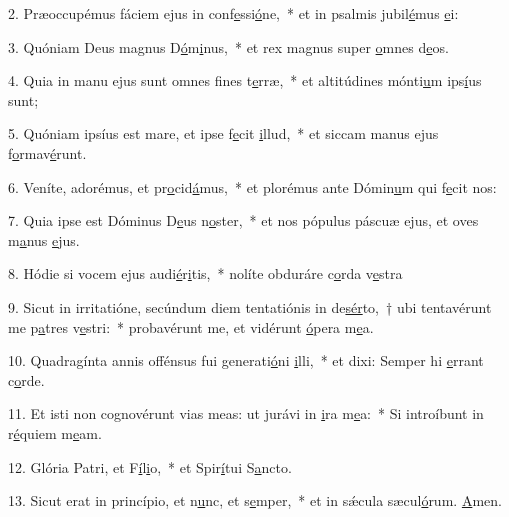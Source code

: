 2. Præoccupémus fáciem ejus in conf\uline{e}ssi\uline{ó}ne,~* et in psalmis jubil\uline{é}mus \uline{e}i:\par 
3. Quóniam Deus magnus D\uline{ó}m\uline{i}nus,~* et rex magnus super \uline{o}mnes d\uline{e}os.\par 
4. Quia in manu ejus sunt omnes f\uline{i}nes t\uline{e}rræ,~* et altitúdines mónti\uline{u}m ips\uline{í}us sunt;\par 
5. Quóniam ipsíus est mare, et ipse f\uline{e}cit \uline{i}llud,~* et siccam manus ejus f\uline{o}rmav\uline{é}runt.\par 
6. Veníte, adorémus, et pr\uline{o}cid\uline{á}mus,~* et plorémus ante Dómin\uline{u}m qui f\uline{e}cit nos:\par 
7. Quia ipse est Dóminus D\uline{e}us n\uline{o}ster,~* et nos pópulus páscuæ ejus, et oves m\uline{a}nus \uline{e}jus.\par 
8. Hódie si vocem ejus audi\uline{é}r\uline{i}tis,~* nolíte obduráre c\uline{o}rda v\uline{e}stra\par 
9. Sicut in irritatióne, secúndum diem tentatiónis in de\uline{sér}to,~† ubi tentavérunt me p\uline{a}tres v\uline{e}stri:~* probavérunt me, et vidérunt \uline{ó}pera m\uline{e}a.\par 
10. Quadragínta annis offénsus fui generati\uline{ó}ni \uline{i}lli,~* et dixi: Semper hi \uline{e}rrant c\uline{o}rde.\par 
11. Et isti non cognovérunt vias meas: ut jurávi in \uline{i}ra m\uline{e}a:~* Si introíbunt in r\uline{é}quiem m\uline{e}am.\par 
12. Glória Patri, et F\uline{í}l\uline{i}o,~* et Spir\uline{í}tui S\uline{a}ncto.\par 
13. Sicut erat in princípio, et n\uline{u}nc, et s\uline{e}mper,~* et in sǽcula sæcul\uline{ó}rum. \uline{A}men.\par 
